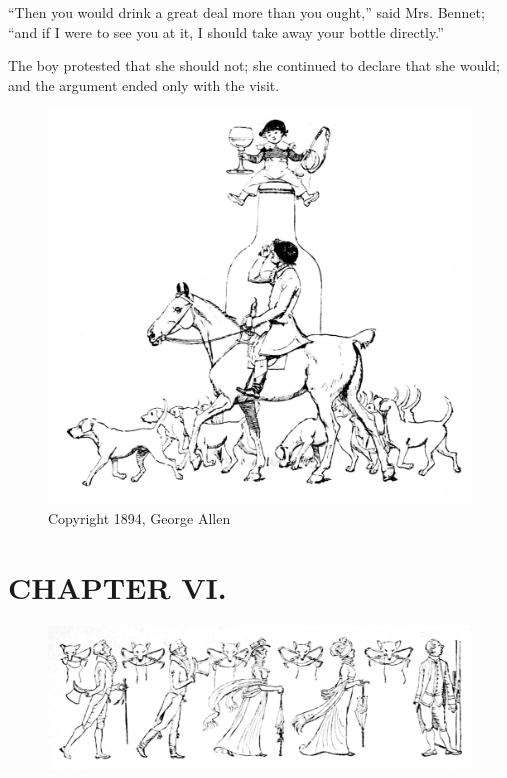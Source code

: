 ``Then you would drink a great deal more than you ought,'' said Mrs. Bennet; ``and if I were to see you at it, I should take away your bottle directly.''

The boy protested that she should not; she continued to declare that she would; and the argument ended only with the visit.


\begin{figure}[htbp]
    \centering
    \includegraphics[width=\textwidth]{illustrations/i_055.jpg}
    \caption{Copyright 1894, George Allen}
    \label{fig:image}
\end{figure}


\chapter{CHAPTER VI.}

\begin{figure}[htbp]
    \centering
    \includegraphics[width=\textwidth]{illustrations/i_056_a.jpg}
\end{figure}


